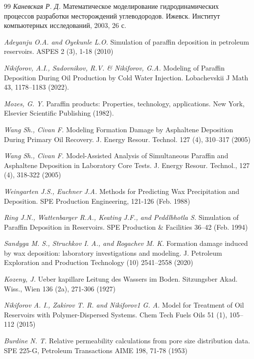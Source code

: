 \documentclass[12pt,twoside,a4paper]{uz_ku}
\begin{document}
\begin{thebibliography}{99}
\textit {Каневская Р. Д.} Математическое моделирование гидродинамических процессов разработки месторождений углеводородов. Ижевск. Институт компьютерных исследований, 2003, 26 с.

\textit {Adeyanju O.A. and Oyekunle L.O.} Simulation of paraffin deposition in petroleum reservoirs. ASPES 2 (3), 1-18 (2010) 

\textit {Nikiforov, A.I., Sadovnikov, R.V. \& Nikiforov, G.A.} Modeling of Paraffin Deposition During Oil Production by Cold Water Injection. Lobachevskii J Math 43, 1178–1183 (2022). 

\textit {Mozes, G. Y.} Paraffin products: Properties, technology, applications. New York, Elsevier Scientific Publishing (1982).

\textit {Wang Sh., Civan F.} Modeling Formation Damage by Asphaltene Deposition During Primary Oil Recovery. J. Energy Resour. Technol. 127 (4), 310–317 (2005) 

\textit {Wang Sh., Civan F.} Model-Assisted Analysis of Simultaneous Paraffin and Asphaltene Deposition in Laboratory Core Tests. J. Energy Resour. Technol., 127 (4), 318-322 (2005) 

\textit {Weingarten J.S., Euchner J.A.} Methods for Predicting Wax Precipitation and Deposition. SPE Production Engineering, 121-126 (Feb. 1988) 

\textit {Ring J.N., Wattenbarger R.A., Keating J.F., and Peddlbhotla S.} Simulation of Paraffin Deposition in Reservoirs. SPE Production \& Facilities 36–42 (Feb. 1994) 

\textit {Sandyga M. S., Struchkov I. A., and Rogachev M. K.} Formation damage induced by wax deposition: laboratory investigations and modeling. J. Petroleum Exploration and Production Technology (10) 2541–2558 (2020)

\textit {Kozeny, J.} Ueber kapillare Leitung des Wassers im Boden. Sitzungsber Akad. Wiss., Wien 136 (2a), 271-306 (1927)

\textit {Nikiforov A. I., Zakirov T. R. and Nikiforov1 G. A.} Model for Treatment of Oil Reservoirs with Polymer-Dispersed Systems. Chem Tech Fuels Oils 51 (1), 105–112 (2015) 

\textit {Burdine N. T.} Relative permeability calculations from pore size distribution data. SPE 225-G, Petroleum Transactions AIME 198, 71-78 (1953) 


\end{thebibliography}
\end{document}
